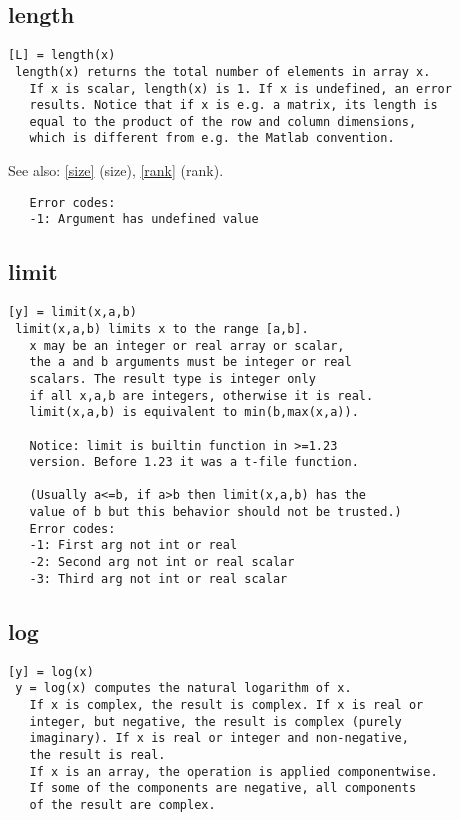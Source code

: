 \documentclass[a4paper]{article}
\begin{document}
\subsection{length\label{length}}

\begin{tscreen}
\begin{verbatim}
[L] = length(x)
 length(x) returns the total number of elements in array x.
   If x is scalar, length(x) is 1. If x is undefined, an error
   results. Notice that if x is e.g. a matrix, its length is
   equal to the product of the row and column dimensions,
   which is different from e.g. the Matlab convention.
\end{verbatim}

See also: \ref{size} {(size)}, \ref{rank} {(rank)}.
\begin{verbatim}
   Error codes:
   -1: Argument has undefined value 
\end{verbatim}
\end{tscreen}



\subsection{limit\label{limit}}

\begin{tscreen}
\begin{verbatim}
[y] = limit(x,a,b)
 limit(x,a,b) limits x to the range [a,b].
   x may be an integer or real array or scalar,
   the a and b arguments must be integer or real
   scalars. The result type is integer only
   if all x,a,b are integers, otherwise it is real.
   limit(x,a,b) is equivalent to min(b,max(x,a)).

   Notice: limit is builtin function in >=1.23
   version. Before 1.23 it was a t-file function.

   (Usually a<=b, if a>b then limit(x,a,b) has the
   value of b but this behavior should not be trusted.)
   Error codes:
   -1: First arg not int or real
   -2: Second arg not int or real scalar
   -3: Third arg not int or real scalar
\end{verbatim}
\end{tscreen}



\subsection{log\label{log}}

\begin{tscreen}
\begin{verbatim}
[y] = log(x)
 y = log(x) computes the natural logarithm of x.
   If x is complex, the result is complex. If x is real or
   integer, but negative, the result is complex (purely
   imaginary). If x is real or integer and non-negative,
   the result is real.
   If x is an array, the operation is applied componentwise.
   If some of the components are negative, all components
   of the result are complex. 
\end{verbatim}
\end{tscreen}
\end{document}
